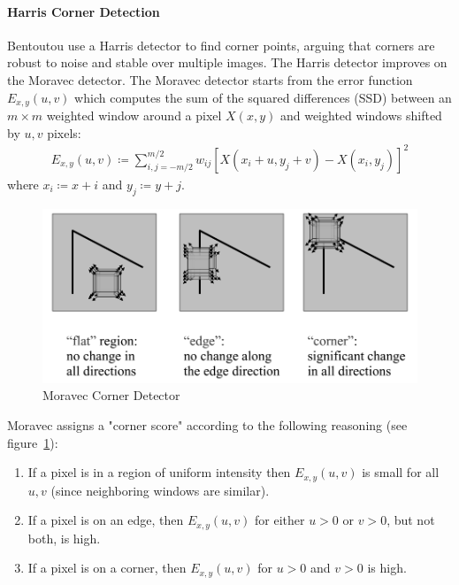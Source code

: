 \paragraph{Harris Corner Detection}
Bentoutou \etal\cite{bentoutou2005automatic} use a Harris detector\cite{harris1988combined} to find corner points, arguing that corners are robust to noise and stable over multiple images.
%
The Harris detector improves on the Moravec\cite{moravec1980obstacle} detector.
%
The Moravec detector starts from the error function $E_{x,y}(u,v)$ which computes the sum of the squared differences (SSD) between an $m \times m$ weighted window around a pixel $X(x, y)$ and weighted windows shifted by $u,v$ pixels:
\begin{equation}
    \begin{split}
        E_{x,y}(u,v) \coloneqq \sum_{i,j=-m/2}^{m/2} w_{ij}\left[ X(x_i+ u,y_j+v) - X(x_i, y_j)\right]^2
    \end{split}
    \label{moravecerrorfunction}
\end{equation}
where $x_i \coloneqq x + i$ and $y_j \coloneqq y+j$.
\begin{figure}
    \centering
    \includegraphics[width=\linewidth,keepaspectratio]{figures/corners.png}
    \caption{Moravec Corner Detector}
    \label{fig:corners}
\end{figure}
Moravec assigns a "corner score" according to the following reasoning (see figure~\ref{fig:corners}):
\begin{enumerate}
    \item If a pixel is in a region of uniform intensity then $E_{x,y}(u,v)$ is small for all $u,v$ (since neighboring windows are similar).
    \item If a pixel is on an edge, then $E_{x,y}(u,v)$ for either $u > 0$ or $v > 0$, but not both, is high.
    \item If a pixel is on a corner, then $E_{x,y}(u,v)$ for $u > 0$ and $v > 0$ is high.
\end{enumerate}
